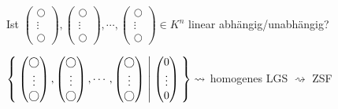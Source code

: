 \documentclass{../tudscript}
\begin{document}
\hypertarget{allgemein-1}{%
\label{allgemein-1}}

Ist
\(\begin{pmatrix}\bigcirc\\ \vdots \\ \bigcirc\end{pmatrix}, \begin{pmatrix}\bigcirc\\ \vdots \\ \bigcirc\end{pmatrix}, \dotsm, \begin{pmatrix}\bigcirc\\ \vdots \\ \bigcirc\end{pmatrix} \in K^n\)
linear abhängig/unabhängig?

\(\Set{\begin{pmatrix}\bigcirc\\ \vdots \\ \bigcirc\end{pmatrix},  \begin{pmatrix}\bigcirc\\ \vdots \\ \bigcirc\end{pmatrix}, \dotsm,  \begin{pmatrix}\bigcirc\\ \vdots \\ \bigcirc\end{pmatrix}|  \begin{pmatrix}0\\ \vdots \\0\end{pmatrix} } \rightsquigarrow\)
homogenes LGS \(\rightsquigarrow\) ZSF
\end{document}
